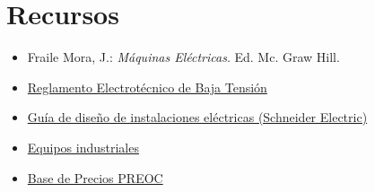 \documentclass[xcolor={usenames,svgnames,dvipsnames}]{beamer}
\begin{document}
\section{Recursos}
\label{sec:orgb7730a8}

\begin{itemize}
\item \alert{Fraile Mora, J.}: \emph{Máquinas Eléctricas}. Ed. Mc. Graw Hill.

\item \href{http://www.f2i2.net/legislacionseguridadindustrial/Si\_ambito.aspx?id\_am=76}{Reglamento Electrotécnico de Baja Tensión}

\item \href{https://www.schneider-electric.es/es/download/document/020511E10/}{Guía de diseño de instalaciones eléctricas (Schneider Electric)}

\item \href{http://www.directindustry.com/}{Equipos industriales}

\item \href{http://www.preoc.es/}{Base de Precios PREOC}
\end{itemize}
\end{document}
